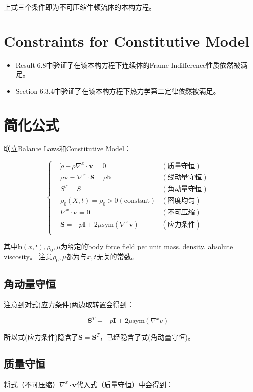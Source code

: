 \documentclass[lang=cn, a4paper,chinesefont=founder,bibend=bibtex]{elegantpaper}
\begin{document}
上式三个条件即为不可压缩牛顿流体的本构方程。

\section{Constraints for Constitutive Model}
\begin{itemize}
	\item Result 6.8中验证了在该本构方程下连续体的Frame-Indifference性质依然被满足。
	\item Section 6.3.4中验证了在该本构方程下热力学第二定律依然被满足。
\end{itemize}



\section{简化公式}
联立Balance Laws和Constitutive Model：

$$
\left\{
\begin{aligned}
%
& \dot{\rho} + \rho\nabla^x\cdot \bm{v} = 0 & (\text{质量守恒}) \\
& \rho\dot{\bm{v}} = \nabla^x\cdot \bm{S} + \rho \bm{b} & (\text{线动量守恒}) \\
& S^T = S & (\text{角动量守恒}) \\
%
& \rho_0(X, t)=\rho_0>0(\text{constant}) & (\text{密度均匀}) \\
& \nabla^x\cdot \bm{v} = 0 & (\text{不可压缩}) \\
& \bm{S}=-p\bm{I}+2\mu \mathrm{sym}(\nabla^x\bm{v}) & (\text{应力条件}) \\
%
\end{aligned}
\right.
$$

其中$\bm{b}(x, t), \rho_0, \mu$为给定的body force field per unit mass, density, absolute viscosity。
注意$\rho_0, \mu$都为与$x, t$无关的常数。

\subsection{角动量守恒}
注意到对式(应力条件)两边取转置会得到：

$$
\bm{S}^T = -p\bm{I} + 2\mu\mathrm{sym}(\nabla^x v)
$$

所以式(应力条件)隐含了$\bm{S}=\bm{S}^T$，已经隐含了式(角动量守恒)。


\subsection{质量守恒}
将式（不可压缩）$\nabla^x\cdot \bm{v}$代入式（质量守恒）中会得到：
\end{document}
